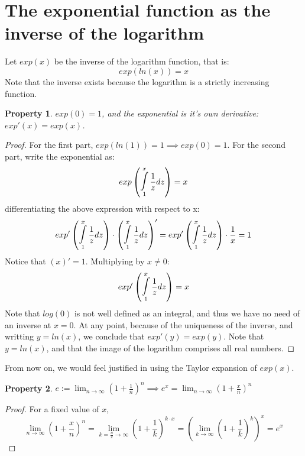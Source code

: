 \documentclass[12pt,oneside,a4paper]{article}
\newtheorem{property}{Property}
\begin{document}
\section{The exponential function as the inverse of the logarithm}
Let $exp(x)$ be the inverse of the logarithm function, that is:
\begin{equation}
exp(ln(x))=x
\end{equation}
Note that the inverse exists because the logarithm is a strictly increasing function.
\begin{property}
$exp(0)=1$, and the exponential is it's own derivative: $exp'(x)= exp(x)$.
\end{property}
\begin{proof}
For the first part, $exp(ln(1))=1 \implies exp(0)=1$. 
For the second part, write the exponential as:
\begin{equation}
exp\left(\mathop{\mathlarger{\mathlarger{\int}}}_{1}^{x} \frac{1}{z} dz\right)=x
\end{equation}
differentiating the above expression with respect to x:
\begin{equation}
exp'\left(\mathop{\mathlarger{\mathlarger{\int}}}_{1}^{x} \frac{1}{z} dz\right)\cdot \left(\mathop{\mathlarger{\mathlarger{\int}}}_{1}^{x} \frac{1}{z} dz\right)' = exp'\left(\mathop{\mathlarger{\mathlarger{\int}}}_{1}^{x} \frac{1}{z} dz\right)\cdot \frac{1}{x} = 1
\end{equation}
Notice that $(x)' = 1$. Multiplying by $x \neq 0$:
\begin{equation}
exp'\left(\mathop{\mathlarger{\mathlarger{\int}}}_{1}^{x} \frac{1}{z} dz\right) = x
\end{equation}
Note that $log(0)$ is not well defined as an integral, and thus we have no need of an inverse at $x=0$.
At any point, because of the uniqueness of the inverse, and writting $y=ln(x)$, we conclude that $exp'(y) = exp(y)$. Note that $y=ln(x)$, and that the image of the logarithm comprises all real numbers.
\end{proof}
From now on, we would feel justified in using the Taylor expansion of $exp(x)$.
\begin{property}
$e:= \lim_{n \to \infty} \left(1+ \frac{1}{n}\right)^n \implies e^x = \lim_{n \to \infty} \left(1+\frac{x}{n}\right)^n$
\end{property}
\begin{proof}
For a fixed value of $x$,
\begin{equation}
\lim_{n \to \infty} \left(1+\frac{x}{n}\right)^n= \lim_{k = \frac{n}{x} \to \infty} \left(1+\frac{1}{k}\right)^{k \cdot x} = \left(\lim_{k \to \infty} \left(1+\frac{1}{k}\right)^{k} \right)^x = e^x
\end{equation}
\end{proof}
\end{document}
